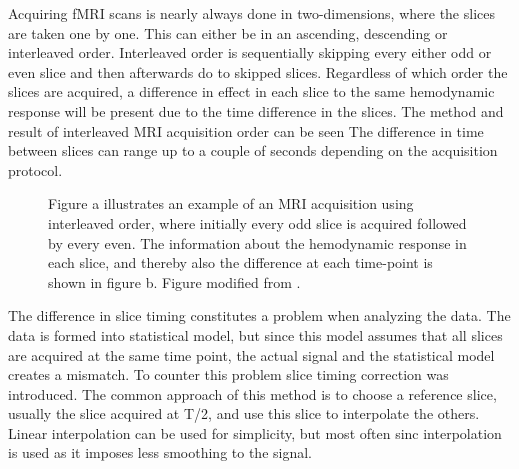 Acquiring fMRI scans is nearly always done in two-dimensions, where the slices are taken one by one. This can either be in an ascending, descending or interleaved order. Interleaved order  is sequentially skipping every either odd or even slice and then afterwards do to skipped slices. Regardless of which order the slices are acquired, a difference in effect in each slice to the same hemodynamic response will be present due to the time difference in the slices. The method and result of interleaved MRI acquisition order can be seen  The difference in time between slices can range up to a couple of seconds depending on the acquisition protocol. 
\begin{figure}[H] 
	\hspace{0.5cm}
	\hspace{0.5cm}
	\caption{Figure a illustrates an example of an MRI acquisition using interleaved order, where initially every odd slice is acquired followed by every even. The information about the hemodynamic response in each slice, and thereby also the difference at each time-point is shown in figure b. Figure modified from \cite{Poldrack2011}.}
	\label{fig:back:interleaved}
\end{figure}

The difference in slice timing constitutes a problem when analyzing the data. The data is formed into statistical model, but since this model assumes that all slices are acquired at the same time point, the actual signal and the statistical model creates a mismatch. To counter this problem slice timing correction was introduced. The common approach of this method is to choose a reference slice, usually the slice acquired at T/2, and use this slice to interpolate the others. Linear interpolation can be used for simplicity, but most often sinc interpolation is used as it imposes less smoothing to the signal.\cite{Poldrack2011} 

